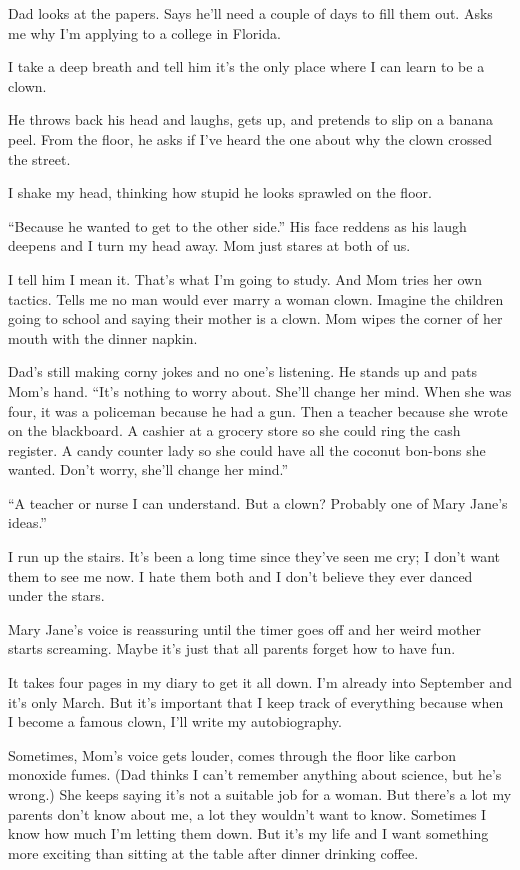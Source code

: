 \documentclass[twoside,10pt]{book}
\begin{document}
Dad looks at the papers. Says he'll need a couple of days to fill them
out. Asks me why I'm applying to a college in Florida.

I take a deep breath and tell him it's the only place where I can learn
to be a clown.

He throws back his head and laughs, gets up, and pretends to slip on a
banana peel. From the floor, he asks if I've heard the one about why the
clown crossed the street.

I shake my head, thinking how stupid he looks sprawled on the floor.

``Because he wanted to get to the other side.'' His face reddens as his
laugh deepens and I turn my head away. Mom just stares at both of us.

I tell him I mean it. That's what I'm going to study. And Mom tries her
own tactics. Tells me no man would ever marry a woman clown. Imagine the
children going to school and saying their mother is a clown. Mom wipes
the corner of her mouth with the dinner napkin.

Dad's still making corny jokes and no one's listening. He stands up and
pats Mom's hand. ``It's nothing to worry about. She'll change her mind.
When she was four, it was a policeman because he had a gun. Then a
teacher because she wrote on the blackboard. A cashier at a grocery
store so she could ring the cash register. A candy counter lady so she
could have all the coconut bon-bons she wanted. Don't worry, she'll
change her mind.''

``A teacher or nurse I can understand. But a clown? Probably one of Mary
Jane's ideas.''

I run up the stairs. It's been a long time since they've seen me cry; I
don't want them to see me now. I hate them both and I don't believe they
ever danced under the stars.

Mary Jane's voice is reassuring until the timer goes off and her weird
mother starts screaming. Maybe it's just that all parents forget how to
have fun.

It takes four pages in my diary to get it all down. I'm already into
September and it's only March. But it's important that I keep track of
everything because when I become a famous clown, I'll write my
autobiography.

Sometimes, Mom's voice gets louder, comes through the floor like carbon
monoxide fumes. (Dad thinks I can't remember anything about science, but
he's wrong.) She keeps saying it's not a suit­able job for a woman. But
there's a lot my parents don't know about me, a lot they wouldn't want
to know. Sometimes I know how much I'm letting them down. But it's my
life and I want something more exciting than sitting at the table after
dinner drinking coffee.
\end{document}
